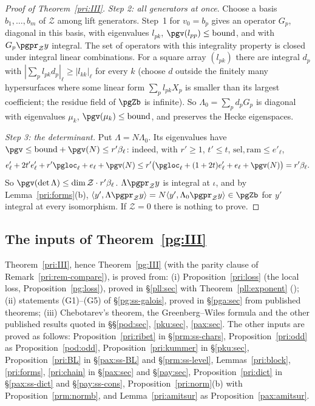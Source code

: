 \documentclass[10pt]{amsart}
\theoremstyle{definition}
\theoremstyle{remark}
\begin{document}
\begin{proof}[Proof of Theorem~\ref{pri:III}]
\emph{Step 2: all generators at once}. Choose a basis $b_1,\dots,b_m$ of $\mathcal Z$ among lift
generators. Step~1 for $v_0=b_p$ gives an operator $G_p$, diagonal in this basis, with eigenvalues
$l_{pk}$, $\pgv(l_{pp})\le\mathrm{bound}$, and with $G_p\pgpr_{\mathcal Z}y$ integral. The set of
operators with this integrality property is closed under integral linear combinations. For a square
array $(l_{pk})$ there are integral $d_p$ with $|\sum_pl_{pk}d_p|_\ell\ge|l_{kk}|_\ell$ for every $k$
(choose $d$ outside the finitely many hypersurfaces where some linear form $\sum_pl_{pk}X_p$ is smaller
than its largest coefficient; the residue field of $\pgZb$ is infinite). So $\Lambda_0=\sum_pd_pG_p$
is diagonal with eigenvalues $\mu_k$, $\pgv(\mu_k)\le\mathrm{bound}$, and preserves the Hecke
eigenspaces.

\emph{Step 3: the determinant.} Put $\Lambda=N\Lambda_0$. Its eigenvalues have $\pgv\le\mathrm{bound}+
\pgv(N)\le r'\beta_\ell$: indeed, with $r'\ge1$, $t'\le t$, $\mathrm{sel},\mathrm{ram}\le e'_\ell$,
\[
e'_\ell+2t'e'_\ell+r'\pgloc_\ell+e_\ell+\pgv(N)\le r'\bigl(\pgloc_\ell+(1+2t)e'_\ell+e_\ell+\pgv(N)
\bigr)=r'\beta_\ell .
\]
So $\pgv(\det\Lambda)\le\dim\mathcal Z\cdot r'\beta_\ell$. $\Lambda\pgpr_{\mathcal Z}y$ is integral at
$\iota$, and by Lemma~\ref{pri:forms}(b), $\langle y',\Lambda\pgpr_{\mathcal Z}y\rangle=N\langle y',
\Lambda_0\pgpr_{\mathcal Z}y\rangle\in\pgZb$ for $y'$ integral at every isomorphism. If $\mathcal Z=0$
there is nothing to prove.
\end{proof}

\subsection{The inputs of Theorem~\ref{pg:III}}\label{pri:ss-summary}

Theorem~\ref{pri:III}, hence Theorem~\ref{pg:III} (with the parity clause of Remark~\ref{pri:rem-compare}),
is proved from: (i) Proposition~\ref{pri:loss} (the local loss, Proposition~\ref{pg:loss}), proved in
\S\ref{pll:sec} with Theorem~\ref{pll:exponent} ({\cite[\S2.3]{P56}}); (ii) statements (G1)--(G5) of
\S\ref{pg:ss-galois}, proved in \S\ref{pga:sec} from published theorems; (iii) Chebotarev's theorem, the
Greenberg--Wiles formula and the other published results quoted in \S\S\ref{pod:sec}, \ref{pku:sec},
\ref{pax:sec}. The other inputs are proved as follows: Proposition~\ref{pri:ribet} in \S\ref{prm:ss-chars},
Proposition~\ref{pri:odd} as Proposition~\ref{pod:odd}, Proposition~\ref{pri:kummer} in \S\ref{pku:sec},
Proposition~\ref{pri:BL} in \S\ref{pax:ss-BL} and \S\ref{prm:ss-level}, Lemmas~\ref{pri:block},
\ref{pri:forms}, \ref{pri:chain} in \S\ref{pax:sec} and \S\ref{pay:sec}, Proposition~\ref{pri:dict} in
\S\ref{pax:ss-dict} and \S\ref{pay:ss-cons}, Proposition~\ref{pri:norm}(b) with Proposition~\ref{prm:normb},
and Lemma~\ref{pri:amitsur} as Proposition~\ref{pax:amitsur}.
\end{document}
